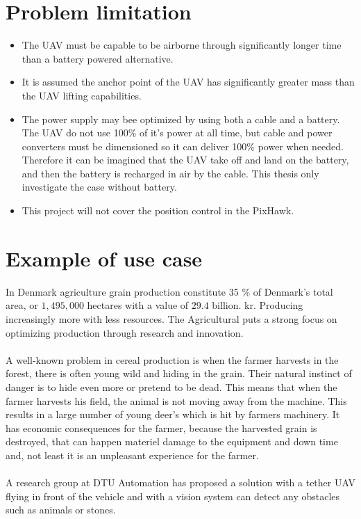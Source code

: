\section{Problem limitation}
\begin{itemize}
\item The UAV must be capable to be airborne through significantly longer time than a battery powered alternative.
\item It is assumed the anchor point of the UAV has significantly greater mass than the UAV lifting capabilities.
\item The power supply may bee optimized by using both a cable and a battery. The UAV do not use 100\% of it's power at all time, but cable and power converters must be dimensioned so it can deliver 100\% power when needed. Therefore it can be imagined that the UAV take off and land on the battery, and then the battery is recharged in air by the cable. This thesis only investigate the case without battery.
\item This project will not cover the position control in the PixHawk. 
\end{itemize}


\section{Example of use case}

In Denmark agriculture grain production constitute 35 \% of Denmark's total area, or $1,495,000$ hectares with a value of $29.4$ billion. kr. Producing increasingly more with less resources. The Agricultural puts a strong focus on optimizing production through research and innovation\cite{FødevarerLandbrug2013}.
\\
\\
A well-known problem in cereal production is when the farmer harvests in the forest, there is often young wild and hiding in the grain. Their natural instinct of danger is to hide even more or pretend to be dead. This means that when the farmer harvests his field, the animal is not moving away from the machine. This results in a large number of young deer's which is hit by farmers machinery. It has economic consequences for the farmer, because the harvested grain is destroyed, that can happen materiel damage to the equipment and down time and, not least it is an unpleasant experience for the farmer.
\\
\\
A research group at DTU Automation has proposed a solution with a tether UAV flying in front of the vehicle and with a vision system can detect any obstacles such as animals or stones.